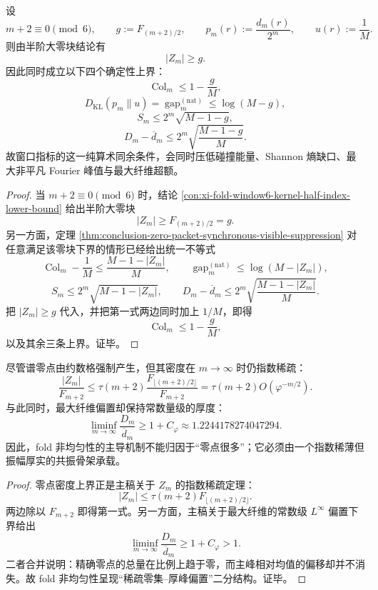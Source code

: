 \begin{theorem}[六倍窗上的算术零块强制四重正则化]\label{thm:conclusion-sixfold-arithmetic-zero-block-fourfold-regularization}
设
\[
m+2\equiv 0\pmod 6,
\qquad
g:=F_{(m+2)/2},
\qquad
p_m(r):=\frac{d_m(r)}{2^m},
\qquad
u(r):=\frac1M.
\]
则由半阶大零块结论有
\[
|Z_m|\ge g.
\]
因此同时成立以下四个确定性上界：
\[
\operatorname{Col}_m\le 1-\frac{g}{M},
\]
\[
D_{\mathrm{KL}}(p_m\|u)=\operatorname{gap}^{(\mathrm{nat})}_m\le \log(M-g),
\]
\[
S_m\le 2^m\sqrt{M-1-g},
\]
\[
D_m-\overline d_m\le 2^m\sqrt{\frac{M-1-g}{M}}.
\]
故窗口指标的这一纯算术同余条件，会同时压低碰撞能量、Shannon 熵缺口、最大非平凡 Fourier 峰值与最大纤维超额。
\end{theorem}
\begin{proof}
当 \(m+2\equiv 0\pmod 6\) 时，结论 \ref{con:xi-fold-window6-kernel-half-index-lower-bound} 给出半阶大零块
\[
|Z_m|\ge F_{(m+2)/2}=g.
\]
另一方面，定理 \ref{thm:conclusion-zero-packet-synchronous-visible-suppression} 对任意满足该零块下界的情形已经给出统一不等式
\[
\operatorname{Col}_m-\frac1M\le \frac{M-1-|Z_m|}{M},
\qquad
\operatorname{gap}^{(\mathrm{nat})}_m\le \log(M-|Z_m|),
\]
\[
S_m\le 2^m\sqrt{M-1-|Z_m|},
\qquad
D_m-\overline d_m\le 2^m\sqrt{\frac{M-1-|Z_m|}{M}}.
\]
把 \(|Z_m|\ge g\) 代入，并把第一式两边同时加上 \(1/M\)，即得
\[
\operatorname{Col}_m\le 1-\frac{g}{M},
\]
以及其余三条上界。证毕。
\end{proof}

\begin{theorem}\label{thm:conclusion-sparse-zero-thick-peak-dichotomy}
尽管谱零点由约数格强制产生，但其密度在 \(m\to\infty\) 时仍指数稀疏：
\[
\frac{|Z_m|}{F_{m+2}}
\le
\tau(m+2)\frac{F_{\lfloor (m+2)/2\rfloor}}{F_{m+2}}
=
\tau(m+2)O(\varphi^{-m/2}).
\]
与此同时，最大纤维偏置却保持常数量级的厚度：
\[
\liminf_{m\to\infty}\frac{D_m}{\overline d_m}\ge 1+C_\varphi\approx 1.2244178274047294.
\]
因此，fold 非均匀性的主导机制不能归因于“零点很多”；它必须由一个指数稀薄但振幅厚实的共振骨架承载。
\end{theorem}
\begin{proof}
零点密度上界正是主稿关于 \(Z_m\) 的指数稀疏定理：
\[
|Z_m|
\le
\tau(m+2)F_{\lfloor (m+2)/2\rfloor}.
\]
两边除以 \(F_{m+2}\) 即得第一式。另一方面，主稿关于最大纤维的常数级 \(L^\infty\) 偏置下界给出
\[
\liminf_{m\to\infty}\frac{D_m}{\overline d_m}\ge 1+C_\varphi>1.
\]
二者合并说明：精确零点的总量在比例上趋于零，而主峰相对均值的偏移却并不消失。故 fold 非均匀性呈现“稀疏零集--厚峰偏置”二分结构。证毕。
\end{proof}


